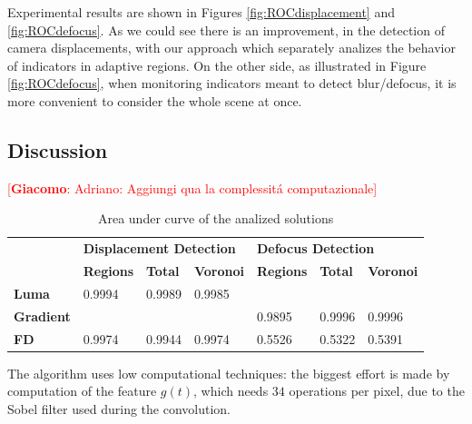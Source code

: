 \documentclass{llncs}
\newcommand{\gi}[1]{{\textcolor{red}{[\small \textbf{Giacomo}: #1]}}}
\begin{document}
Experimental results are shown in Figures \ref{fig:ROCdisplacement} and \ref{fig:ROCdefocus}.
As we could see there is an improvement, in the detection of camera displacements, with our approach which separately analizes the behavior of indicators in adaptive regions.
On the other side, as illustrated in Figure \ref{fig:ROCdefocus}, when monitoring indicators meant to detect blur/defocus, it is more convenient to consider the whole scene at once.
\subsection{Discussion}
\gi{Adriano: Aggiungi qua la complessit\'a computazionale}
\begin{table}[tbh]
\centering
\begin{tabular}{l|l|l|l|l|l|l|}
\cline{2-7}
& \multicolumn{3}{l|}{\cellcolor[HTML]{C0C0C0}\textbf{Displacement Detection}}  & \multicolumn{3}{l|}{\cellcolor[HTML]{C0C0C0}\textbf{Defocus Detection}} \\ \cline{2-7} 
& \cellcolor[HTML]{EFEFEF}\textbf{Regions} & \cellcolor[HTML]{EFEFEF}\textbf{Total} & \cellcolor[HTML]{EFEFEF}\textbf{Voronoi} & \cellcolor[HTML]{EFEFEF}\textbf{Regions} & \cellcolor[HTML]{EFEFEF}\textbf{Total} & \cellcolor[HTML]{EFEFEF}\textbf{Voronoi} \\ \hline
\multicolumn{1}{|l|}{\cellcolor[HTML]{EFEFEF}\textbf{Luma}}     & 0.9994 & 0.9989 & 0.9985  &            &            &             \\ \hline
\multicolumn{1}{|l|}{\cellcolor[HTML]{EFEFEF}\textbf{Gradient}} &  		 &  		  &             & 0.9895 & 0.9996 & 0.9996  \\ \hline
\multicolumn{1}{|l|}{\cellcolor[HTML]{EFEFEF}\textbf{FD}}         & 0.9974 & 0.9944 & 0.9974  & 0.5526 & 0.5322 & 0.5391  \\ \hline
\end{tabular}
\caption{Area under curve of the analized solutions}
\label{tab:AUC}
\end{table}

The algorithm uses low computational techniques: the biggest effort is made by computation of the feature $g(t)$, which needs $34$ operations per pixel, due to the Sobel filter used during the convolution.
\end{document}
